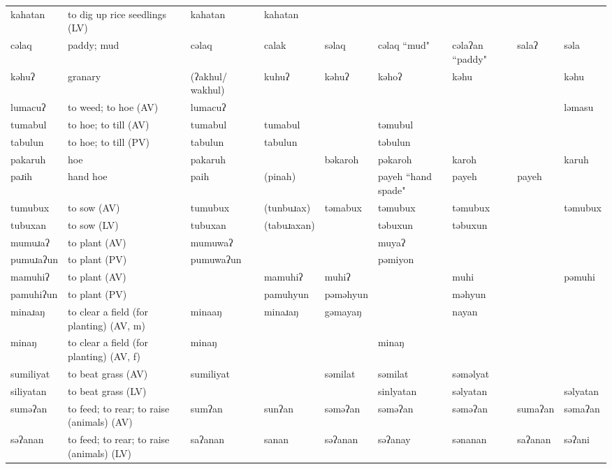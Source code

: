 \begin{landscape}
\begin{longtable}{*{9}{>{\raggedright\arraybackslash}p{}}}
\text{*}kahatan & to dig up rice seedlings (LV) & kahatan & kahatan &  &  &  &  & \\
\text{*}cəlaq & paddy; mud & cəlaq & calak & səlaq & cəlaq ``mud" & cəlaʔan ``paddy" & salaʔ & səla\\
\text{*}kəhuʔ & granary & (ʔakhul/ \newline wakhul) & kuhuʔ & kəhuʔ & kəhoʔ & kəhu &  & kəhu\\
\text{*}lumacuʔ & to weed; to hoe (AV) & lumacuʔ &  &  &  &  &  & ləmasu\\
\text{*}tumabul & to hoe; to till (AV) & tumabul & tumabul &  & təmubul &  &  & \\
\text{*}tabulun & to hoe; to till (PV) & tabulun & tabulun &  & təbulun &  &  & \\
\text{*}pakaruh & hoe & pakaruh &  & bəkaroh & pəkaroh & karoh &  & karuh\\
\text{*}paɹih & hand hoe & paih & (pinah) &  & payeh \newline ``hand spade" & payeh & payeh & \\
\text{*}tumubux & to sow (AV) & tumubux & (tunbuɹax) & təmabux & təmubux & təmubux &  & təmubux\\
\text{*}tubuxan & to sow (LV) & tubuxan & (tabuɹaxan) &  & təbuxun & təbuxun &  & \\
\text{*}mumuɹaʔ & to plant (AV) & mumuwaʔ &  &  & muyaʔ &  &  & \\
\text{*}pumuɹaʔun & to plant (PV) & pumuwaʔun &  &  & pəmiyon &  &  & \\
\text{*}mamuhiʔ & to plant (AV) &  & mamuhiʔ & muhiʔ &  & muhi &  & pəmuhi\\
\text{*}pamuhiʔun & to plant (PV) &  & pamuhyun & pəməhyun &  & məhyun &  & \\
\text{*}minaɹaŋ & to clear a field (for planting) (AV, m) & minaaŋ & minaɹaŋ & gəmayaŋ &  & nayan &  & \\
\text{*}minaŋ & to clear a field (for planting) (AV, f) & minaŋ &  &  & minaŋ &  &  & \\
\text{*}sumiliyat & to beat grass (AV) & sumiliyat &  & səmilat & səmilat & səməlyat &  & \\
\text{*}siliyatan & to beat grass (LV) &  &  &  & sinlyatan & səlyatan &  & səlyatan\\
\text{*}suməʔan & to feed; to rear; to raise (animals) (AV) & sumʔan & sunʔan & səməʔan & səməʔan & səməʔan & sumaʔan & səmaʔan\\
\text{*}səʔanan & to feed; to rear; to raise (animals) (LV) & saʔanan & sanan & səʔanan & səʔanay & sənanan & saʔanan & səʔani\\

\end{longtable}
\end{landscape}

